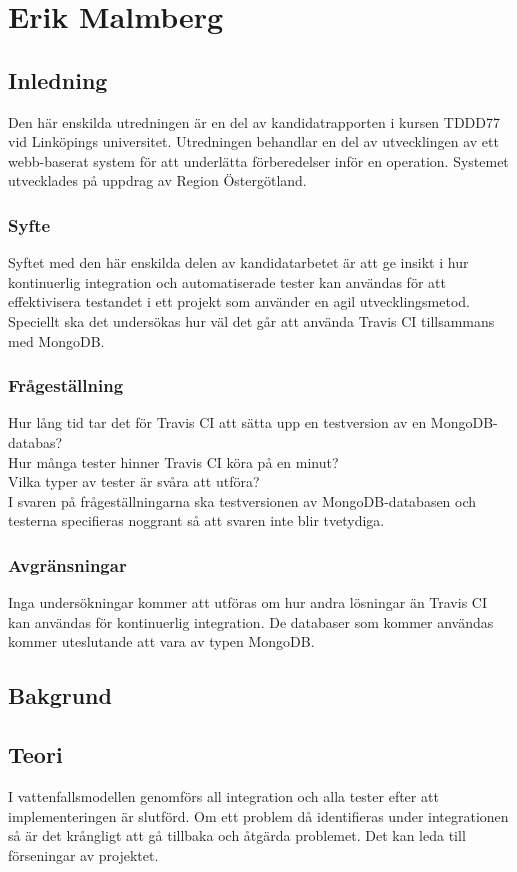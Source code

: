 \section{Erik Malmberg}
\subsection{Inledning}
Den här enskilda utredningen är en del av kandidatrapporten i kursen TDDD77 vid Linköpings universitet.
Utredningen behandlar en del av utvecklingen av ett webb-baserat system för att underlätta förberedelser
inför en operation. Systemet utvecklades på uppdrag av Region Östergötland.

\subsubsection{Syfte}
Syftet med den här enskilda delen av kandidatarbetet är att ge insikt i hur kontinuerlig integration och 
automatiserade tester kan användas för att effektivisera testandet i ett projekt som använder en agil 
utvecklingsmetod. Speciellt ska det undersökas hur väl det går att använda Travis CI tillsammans med MongoDB.

\subsubsection{Frågeställning}
Hur lång tid tar det för Travis CI att sätta upp en testversion av en MongoDB-databas?\\
Hur många tester hinner Travis CI köra på en minut?\\
Vilka typer av tester är svåra att utföra?\\

I svaren på frågeställningarna ska testversionen av MongoDB-databasen och testerna specifieras noggrant 
så att svaren inte blir tvetydiga.

\subsubsection{Avgränsningar}
Inga undersökningar kommer att utföras om hur andra lösningar än Travis CI kan användas för kontinuerlig 
integration. De databaser som kommer användas kommer uteslutande att vara av typen MongoDB.

\subsection{Bakgrund}
\subsection{Teori}
I vattenfallsmodellen genomförs all integration och alla tester efter att implementeringen är slutförd. 
Om ett problem då identifieras under integrationen så är det krångligt att gå tillbaka och åtgärda problemet. 
Det kan leda till förseningar av projektet.\\

